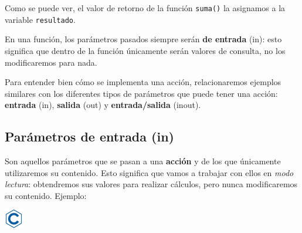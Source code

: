 \documentclass[
]{book}
\begin{document}
Como se puede ver, el valor de retorno de la función \texttt{suma()} la asignamos a la variable \texttt{resultado}.

En una función, los parámetros pasados siempre serán \textbf{de entrada} (in): esto significa que dentro de la función únicamente serán valores de consulta, no los modificaremos para nada.

Para entender bien cómo se implementa una acción, relacionaremos ejemplos similares con los diferentes tipos de parámetros que puede tener una acción: \textbf{entrada} (in), \textbf{salida} (out) y \textbf{entrada/salida} (inout).

\hypertarget{paruxe1metros-de-entrada-in}{%
\subsection{Parámetros de entrada (in)}\label{paruxe1metros-de-entrada-in}}

Son aquellos parámetros que se pasan a una \textbf{acción} y de los que únicamente utilizaremos su contenido. Esto significa que vamos a trabajar con ellos en \emph{modo lectura}: obtendremos sus valores para realizar cálculos, pero nunca modificaremos su contenido. Ejemplo:

\includegraphics{./img/c.png}
\end{document}
